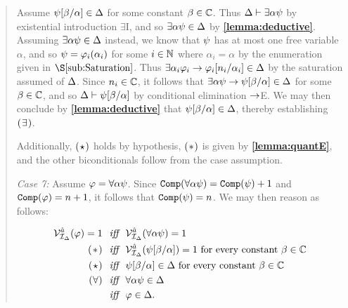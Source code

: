 \begin{quote}
  Assume $\psi[\beta/\alpha]\in\Delta$ for some constant $\beta\in\mathbb{C}$.
  Thus $\Delta\vdash \exists \alpha\psi$ by existential introduction $\exists$I, and so $\exists \alpha\psi\in\Delta$ by \textbf{\ref{lemma:deductive}}.
  Assuming $\exists \alpha\psi\in\Delta$ instead, we know that $\psi$ has at most one free variable $\alpha$, and so $\psi=\varphi_i(\alpha_i)$ for some $i\in\mathbb{N}$ where $\alpha_i=\alpha$ by the enumeration given in $\S\ref{sub:Saturation}$.
  Thus $\exists \alpha_i\varphi_i\rightarrow \varphi_i[n_i/\alpha_i]\in\Delta$ by the saturation assumed of $\Delta$.
  Since $n_i\in\mathbb{C}$, it follows that $\exists \alpha\psi\rightarrow\psi[\beta/\alpha]\in\Delta$ for some $\beta\in\mathbb{C}$, and so $\Delta\vdash\psi[\beta/\alpha]$ by conditional elimination $\rightarrow$E. 
  We may then conclude by \textbf{\ref{lemma:deductive}} that $\psi[\beta/\alpha]\in\Delta$, thereby establishing $(\hspace{.7pt}\exists\hspace{.7pt})$.

  Additionally, $(\hspace{.7pt}\star\hspace{.7pt})$ holds by hypothesis, $(\hspace{.7pt}\ast\hspace{.7pt})$ is given by \textbf{\ref{lemma:quantE}}, and the other biconditionals follow from the case assumption.

  \textit{Case 7:}
  Assume $\varphi=\forall \alpha\psi$.
  Since $\texttt{Comp}(\forall \alpha\psi)=\texttt{Comp}(\psi)+1$ and $\texttt{Comp}(\varphi)=n+1$, it follows that $\texttt{Comp}(\psi)=n$.
  We may then reason as follows:

  \vspace{-.2in}
  \begin{align*}
    \mathcal{V}_{\mathcal{I}_{\Delta}}^{\hat{a}}(\varphi)=1 &\textit{ ~iff~ } \mathcal{V}_{\mathcal{I}_{\Delta}}^{\hat{a}}(\forall \alpha\psi)=1\\
      (\hspace{1pt}\ast\hspace{1pt}) &\textit{ ~iff~ } \mathcal{V}_{\mathcal{I}_{\Delta}}^{\hat{a}}(\psi[\beta/\alpha])=1 \text{ for every constant } \beta\in\mathbb{C}\\
      (\hspace{.7pt}\star\hspace{.7pt}) &\textit{ ~iff~ } \psi[\beta/\alpha]\in\Delta \text{ for every constant } \beta\in\mathbb{C}\\ 
      (\hspace{.3pt}\forall\hspace{.3pt}) &\textit{ ~iff~ } \forall \alpha\psi\in\Delta \\
      &\textit{ ~iff~ } \varphi\in\Delta.
  \end{align*}


\end{quote}
